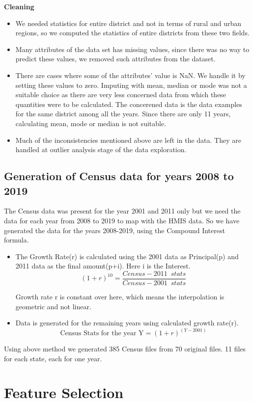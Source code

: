 \documentclass[12pt]{article}
\begin{document}
\bigskip
\textbf{Cleaning}
\begin{itemize}
	\item We needed statistics for entire district and not in terms of rural and urban regions, so we computed the statistics of entire districts from these two fields.
	\item Many attributes of the data set has missing values, since there was no way to predict these values, we removed such attributes from the dataset.
	\item There are cases where some of the attributes' value is NaN. We handle it by setting these values to zero. Imputing with mean, median or mode was not a suitable choice as there are very less concerned data from which these quantities were to be calculated. The concerened data is the data examples for the same district among all the years. Since there are only 11 years, calculating mean, mode or median is not suitable.
	\item Much of the inconsistencies mentioned above are left in the data. They are handled at outlier analysis stage of the data exploration.  
\end{itemize}


\subsection{Generation of Census data for years 2008 to 2019}
 The Census data was present for the year 2001 and 2011 only but we need the data for each year from 2008 to 2019 to map with the HMIS data. So we have generated the data for the years 2008-2019, using the Compound Interest formula.
\begin{itemize}
\item The Growth Rate(r) is calculated using the 2001 data as Principal(p) and 2011 data as the final amount(p+i). Here i is the Interest.
$$ 
(1+r)^{10} = \frac{Census-2011\enspace stats}{Census-2001 \enspace stats} 
$$

Growth rate r is constant over here, which means the interpolation is geometric and not linear.
\item Data is generated for the remaining years using calculated growth rate(r).
$$
\text{Census Stats for the year Y} =  (1 + r)^{(Y-2001)}
$$
\end{itemize}

Using above method we generated 385 Census files from 70 original files. 11 files for each state, each for one year.

\section{Feature Selection}
\end{document}
